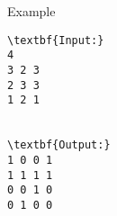 Example
\begin{verbatim}
\textbf{Input:}
4
3 2 3
2 3 3
1 2 1


\textbf{Output:}
1 0 0 1
1 1 1 1
0 0 1 0
0 1 0 0
\end{verbatim}